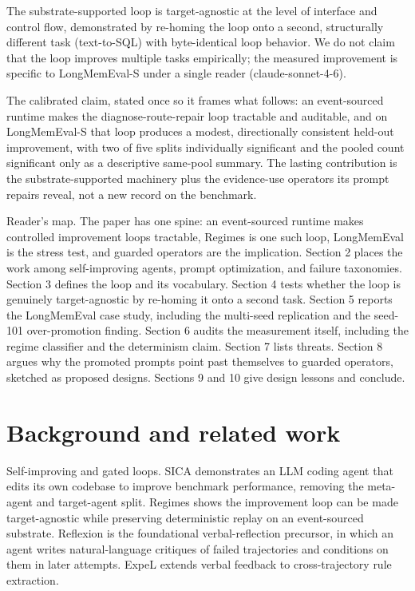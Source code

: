 The substrate-supported loop is target-agnostic at the level of interface and control flow, demonstrated by re-homing the loop onto a second, structurally different task (text-to-SQL) with byte-identical loop behavior. We do not claim that the loop improves multiple tasks empirically; the measured improvement is specific to LongMemEval-S under a single reader (claude-sonnet-4-6).

The calibrated claim, stated once so it frames what follows: an event-sourced runtime makes the diagnose-route-repair loop tractable and auditable, and on LongMemEval-S that loop produces a modest, directionally consistent held-out improvement, with two of five splits individually significant and the pooled count significant only as a descriptive same-pool summary. The lasting contribution is the substrate-supported machinery plus the evidence-use operators its prompt repairs reveal, not a new record on the benchmark.

Reader's map. The paper has one spine: an event-sourced runtime makes controlled improvement loops tractable, Regimes is one such loop, LongMemEval is the stress test, and guarded operators are the implication. Section 2 places the work among self-improving agents, prompt optimization, and failure taxonomies. Section 3 defines the loop and its vocabulary. Section 4 tests whether the loop is genuinely target-agnostic by re-homing it onto a second task. Section 5 reports the LongMemEval case study, including the multi-seed replication and the seed-101 over-promotion finding. Section 6 audits the measurement itself, including the regime classifier and the determinism claim. Section 7 lists threats. Section 8 argues why the promoted prompts point past themselves to guarded operators, sketched as proposed designs. Sections 9 and 10 give design lessons and conclude.


\section{Background and related work}

Self-improving and gated loops. SICA \citep{robeyns2025sica} demonstrates an LLM coding agent that edits its own codebase to improve benchmark performance, removing the meta-agent and target-agent split. Regimes shows the improvement loop can be made target-agnostic while preserving deterministic replay on an event-sourced substrate. Reflexion \citep{shinn2023reflexion} is the foundational verbal-reflection precursor, in which an agent writes natural-language critiques of failed trajectories and conditions on them in later attempts. ExpeL \citep{zhao2024expel} extends verbal feedback to cross-trajectory rule extraction.

